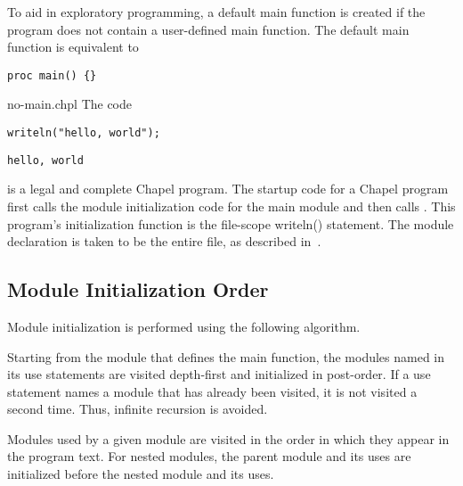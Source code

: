 To aid in exploratory programming, a default main function is
created if the program does not contain a user-defined main function.  The
default main function is equivalent to
\begin{chapel}
\begin{verbatim}
proc main() {}
\end{verbatim}
\end{chapel}

\begin{chapelexample}{no-main.chpl}
The code
\begin{chapel}
\begin{verbatim}
writeln("hello, world");

\end{verbatim}
\end{chapel}
\begin{chapeloutput}
\begin{verbatim}
hello, world
\end{verbatim}
\end{chapeloutput}
is a legal and complete Chapel program.  The startup code for a Chapel program
first calls the module initialization code for the main module and then
calls .  This program's initialization function is the file-scope
writeln() statement.  The module declaration is taken to be the entire file,
as described in~.
\end{chapelexample}


\subsection{Module Initialization Order}
\label{Module_Initialization_Order}

Module initialization is performed using the following algorithm.

Starting from the module that defines the main function, the modules named in
its use statements are visited depth-first and initialized in post-order.  If a
use statement names a module that has already been visited, it is not visited a
second time.  Thus, infinite recursion is avoided.

Modules used by a given module are visited in the order in which
they appear in the program text.  For nested modules, the
parent module and its uses are initialized before the nested module and its uses.

